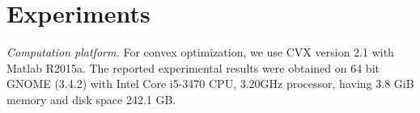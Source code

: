 
\section{Experiments} \label{sec:exp}
\emph{Computation platform.} For convex optimization, we use CVX
version 2.1 with Matlab R2015a.  The reported experimental results were
obtained on 64 bit GNOME (3.4.2) with Intel Core i5-3470 CPU, 3.20GHz
processor, having 3.8 GiB memory and disk space 242.1 GB.









